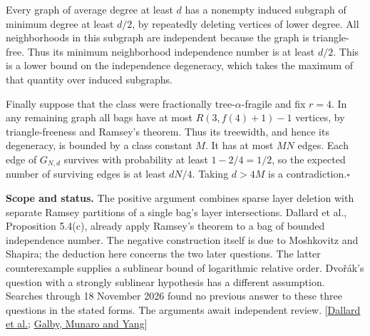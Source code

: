 \documentclass[11pt]{article}
\newcommand{\done}{\hfill\(\square\)}
\begin{document}
Every graph of average degree at least $d$ has a nonempty induced subgraph of minimum degree at least $d/2$, by repeatedly deleting vertices of lower degree. All neighborhoods in this subgraph are independent because the graph is triangle-free. Thus its minimum neighborhood independence number is at least $d/2$. This is a lower bound on the independence degeneracy, which takes the maximum of that quantity over induced subgraphs.

Finally suppose that the class were fractionally tree-$\alpha$-fragile and fix $r=4$. In any remaining graph all bags have at most $R(3,f(4)+1)-1$ vertices, by triangle-freeness and Ramsey's theorem. Thus its treewidth, and hence its degeneracy, is bounded by a class constant $M$. It has at most $MN$ edges. Each edge of $G_{N,d}$ survives with probability at least $1-2/4=1/2$, so the expected number of surviving edges is at least $dN/4$. Taking $d>4M$ is a contradiction.\done

\small
\textbf{Scope and status.} The positive argument combines sparse layer deletion with separate Ramsey partitions of a single bag's layer intersections. Dallard et al., Proposition 5.4(c), already apply Ramsey's theorem to a bag of bounded independence number. The negative construction itself is due to Moshkovitz and Shapira; the deduction here concerns the two later questions. The latter counterexample supplies a sublinear bound of logarithmic relative order. Dvo\v r\'ak's question with a strongly sublinear hypothesis has a different assumption. Searches through 18 November 2026 found no previous answer to these three questions in the stated forms. The arguments await independent review. [\href{https://arxiv.org/abs/2506.12424}{Dallard et al.}; \href{https://arxiv.org/abs/2402.18352}{Galby, Munaro and Yang}]
\end{document}
